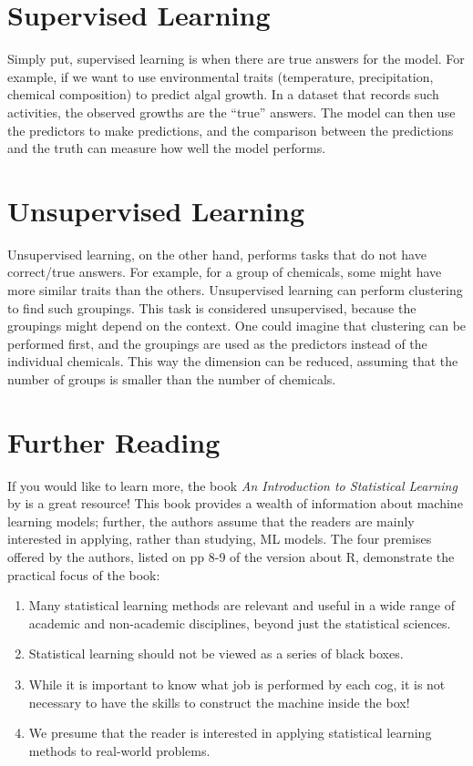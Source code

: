 \documentclass[
]{book}
\providecommand{\tightlist}{%
  \setlength{\itemsep}{0pt}\setlength{\parskip}{0pt}}
\begin{document}
\hypertarget{supervised-learning}{%
\section{Supervised Learning}\label{supervised-learning}}

Simply put, supervised learning is when there are true answers for the model. For example, if we want to use environmental traits (temperature, precipitation, chemical composition) to predict algal growth. In a dataset that records such activities, the observed growths are the ``true'' answers. The model can then use the predictors to make predictions, and the comparison between the predictions and the truth can measure how well the model performs.

\hypertarget{unsupervised-learning}{%
\section{Unsupervised Learning}\label{unsupervised-learning}}

Unsupervised learning, on the other hand, performs tasks that do not have correct/true answers. For example, for a group of chemicals, some might have more similar traits than the others. Unsupervised learning can perform clustering to find such groupings. This task is considered unsupervised, because the groupings might depend on the context. One could imagine that clustering can be performed first, and the groupings are used as the predictors instead of the individual chemicals. This way the dimension can be reduced, assuming that the number of groups is smaller than the number of chemicals.

\hypertarget{further-reading}{%
\section{Further Reading}\label{further-reading}}

If you would like to learn more, the book \emph{An Introduction to Statistical Learning} by \citet{james2013introduction} is a great resource! This book provides a wealth of information about machine learning models; further, the authors assume that the readers are mainly interested in applying, rather than studying, ML models. The four premises offered by the authors, listed on pp 8-9 of the version about R, demonstrate the practical focus of the book:

\begin{enumerate}
\def\labelenumi{\arabic{enumi}.}
\tightlist
\item
  Many statistical learning methods are relevant and useful in a wide range of academic and non-academic disciplines, beyond just the statistical sciences.
\item
  Statistical learning should not be viewed as a series of black boxes.
\item
  While it is important to know what job is performed by each cog, it is not necessary to have the skills to construct the machine inside the box!
\item
  We presume that the reader is interested in applying statistical learning methods to real-world problems.
\end{enumerate}
\end{document}
